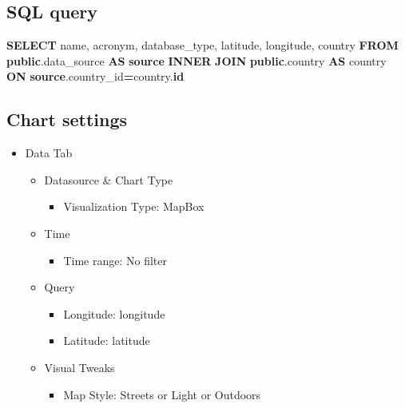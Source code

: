 \documentclass[
]{book}
\newenvironment{Shaded}{\begin{snugshade}}{\end{snugshade}}
\newcommand{\KeywordTok}[1]{\textcolor[rgb]{0.13,0.29,0.53}{\textbf{#1}}}
\newcommand{\NormalTok}[1]{#1}
\newcommand{\OperatorTok}[1]{\textcolor[rgb]{0.81,0.36,0.00}{\textbf{#1}}}
\providecommand{\tightlist}{%
  \setlength{\itemsep}{0pt}\setlength{\parskip}{0pt}}
\begin{document}
\hypertarget{sql-query-5}{%
\subsection{SQL query}\label{sql-query-5}}

\begin{Shaded}
\begin{Highlighting}[]
\KeywordTok{SELECT}\NormalTok{  name,}
\NormalTok{        acronym,}
\NormalTok{        database\_type,}
\NormalTok{        latitude,}
\NormalTok{        longitude,}
\NormalTok{        country}
\KeywordTok{FROM} \KeywordTok{public}\NormalTok{.data\_source }\KeywordTok{AS} \KeywordTok{source}
\KeywordTok{INNER} \KeywordTok{JOIN} \KeywordTok{public}\NormalTok{.country }\KeywordTok{AS}\NormalTok{ country }\KeywordTok{ON} \KeywordTok{source}\NormalTok{.country\_id}\OperatorTok{=}\NormalTok{country.}\KeywordTok{id}
\end{Highlighting}
\end{Shaded}

\hypertarget{chart-settings-5}{%
\subsection{Chart settings}\label{chart-settings-5}}

\begin{itemize}
\item
  Data Tab

  \begin{itemize}
  \item
    Datasource \& Chart Type

    \begin{itemize}
    \tightlist
    \item
      Visualization Type: MapBox
    \end{itemize}
  \item
    Time

    \begin{itemize}
    \tightlist
    \item
      Time range: No filter
    \end{itemize}
  \item
    Query

    \begin{itemize}
    \item
      Longitude: longitude
    \item
      Latitude: latitude
    \end{itemize}
  \item
    Visual Tweaks

    \begin{itemize}
    \tightlist
    \item
      Map Style: Streets or Light or Outdoors
    \end{itemize}
  \end{itemize}
\end{itemize}
\end{document}

